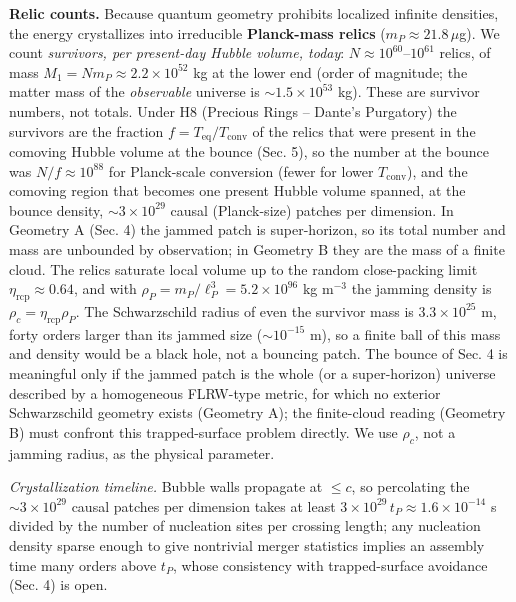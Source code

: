 \documentclass[
  11pt,
]{article}
\begin{document}
\textbf{Relic counts.} Because quantum geometry prohibits localized
infinite densities, the energy crystallizes into irreducible
\textbf{Planck-mass relics} (\(m_P \approx 21.8\,\mu\)g). We count
\emph{survivors, per present-day Hubble volume, today}:
\(N \approx 10^{60}\)--\(10^{61}\) relics, of mass
\(M_1 = N m_P \approx 2.2\times10^{52}\) kg at the lower end (order of
magnitude; the matter mass of the \emph{observable} universe is
\(\sim\!1.5\times10^{53}\) kg). These are survivor numbers, not totals.
Under H8 (Precious Rings -- Dante's Purgatory) the survivors are the
fraction \(f = T_{\text{eq}}/T_{\text{conv}}\) of the relics that were
present in the comoving Hubble volume at the bounce (Sec. 5), so the
number at the bounce was \(N/f \approx 10^{88}\) for Planck-scale
conversion (fewer for lower \(T_{\text{conv}}\)), and the comoving
region that becomes one present Hubble volume spanned, at the bounce
density, \(\sim\!3\times10^{29}\) causal (Planck-size) patches per
dimension. In Geometry A (Sec. 4) the jammed patch is super-horizon, so
its total number and mass are unbounded by observation; in Geometry B
they are the mass of a finite cloud. The relics saturate local volume up
to the random close-packing limit \(\eta_{\text{rcp}} \approx 0.64\),
and with \(\rho_P = m_P/\ell_P^3 = 5.2\times10^{96}\) kg m\(^{-3}\) the
jamming density is \(\rho_c = \eta_{\text{rcp}}\rho_P\). The
Schwarzschild radius of even the survivor mass is \(3.3\times10^{25}\)
m, forty orders larger than its jammed size (\(\sim\!10^{-15}\) m), so a
finite ball of this mass and density would be a black hole, not a
bouncing patch. The bounce of Sec. 4 is meaningful only if the jammed
patch is the whole (or a super-horizon) universe described by a
homogeneous FLRW-type metric, for which no exterior Schwarzschild
geometry exists (Geometry A); the finite-cloud reading (Geometry B) must
confront this trapped-surface problem directly. We use \(\rho_c\), not a
jamming radius, as the physical parameter.

\emph{Crystallization timeline.} Bubble walls propagate at \(\leq c\),
so percolating the \(\sim\!3\times10^{29}\) causal patches per dimension
takes at least \(3\times10^{29}\,t_P \approx 1.6\times10^{-14}\) s
divided by the number of nucleation sites per crossing length; any
nucleation density sparse enough to give nontrivial merger statistics
implies an assembly time many orders above \(t_P\), whose consistency
with trapped-surface avoidance (Sec. 4) is open.
\end{document}
